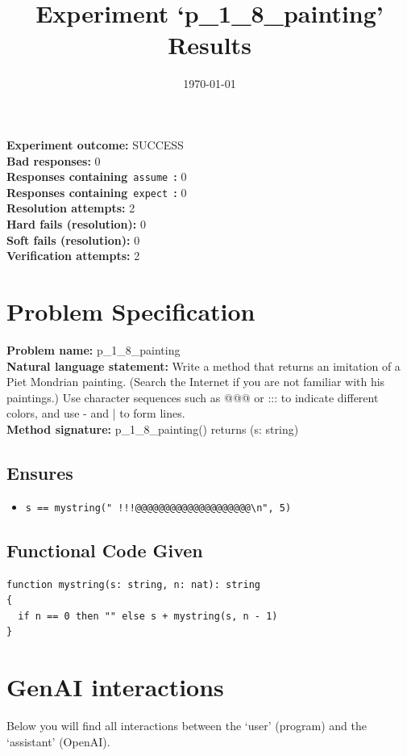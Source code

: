 \documentclass{article}
\begin{document}
\title{Experiment `p\_1\_8\_painting' Results}
\author{\today}
\date{}
\maketitle
\textbf{Experiment outcome: }SUCCESS
\\\textbf{Bad responses: }0
\\\textbf{Responses containing}~\texttt{assume}~\textbf{: }0
\\\textbf{Responses containing}~\texttt{expect}~\textbf{: }0
\\\textbf{Resolution attempts: }2
\\\textbf{Hard fails (resolution): }0
\\\textbf{Soft fails (resolution): }0
\\\textbf{Verification attempts: }2
\section*{Problem Specification}
\textbf{Problem name: }p\_1\_8\_painting
\\\textbf{Natural language statement: }Write a method that returns an imitation of a Piet Mondrian painting. (Search the Internet if you are not familiar with his paintings.) Use character sequences such as @@@ or ::: to indicate different colors, and use - and | to form lines.
\\\textbf{Method signature: }p\_1\_8\_painting() returns (s: string)
\subsection*{Ensures}
\begin{itemize}
\item \texttt{s == mystring("          !!!@@@@@@@@@@@@@@@@@@@@\textbackslash{}n", 5)}
\end{itemize}
\subsection*{Functional Code Given}
\begin{lstlisting}
function mystring(s: string, n: nat): string
{
  if n == 0 then "" else s + mystring(s, n - 1)
}
\end{lstlisting}
\clearpage
\section*{GenAI interactions}
Below you will find all interactions between the `user' (program) and the `assistant' (OpenAI).
\end{document}
